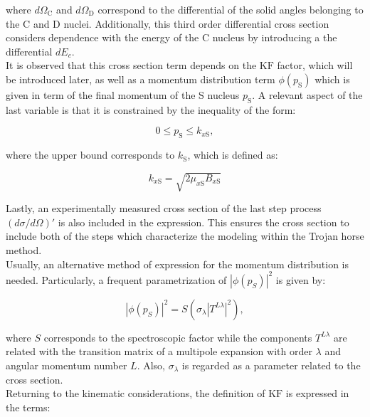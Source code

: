 \documentclass[openany]{book}
\begin{document}
where $d\Omega_\mathrm{C}$ and $d\Omega_\mathrm{D}$ correspond to the differential of the solid angles belonging to the C and D nuclei. Additionally, this third order differential cross section considers dependence with the energy of the C nucleus by introducing a the differential $dE_c$. \\ 

It is observed that this cross section term depends on the $\mathrm{KF}$ factor, which will be introduced later, as well as a momentum distribution term $\phi(p_\mathrm{S})$ which is given in term of the final momentum of the S nucleus $p_\mathrm{S}$. A relevant aspect of the last variable is that it is constrained by the inequality of the form:

\begin{equation}\label{eq:special_THM_momentum_inequality}
	0 \le p_\mathrm{S} \le k_{x\mathrm{S}},
\end{equation}

where the upper bound corresponds to $k_{\mathrm{S}}$, which is defined as: 

\begin{equation}\label{eq:special_THM_momentum_max}
	k_{x\mathrm{S}} = \sqrt{2 \mu_{x\mathrm{S}}  B_{x\mathrm{S}}}
\end{equation}

Lastly, an experimentally measured cross section of the last step process $(d\sigma/d\Omega)'$ is also included in the expression. This ensures the cross section to include both of the steps which characterize the modeling within the Trojan horse method.  \\

Usually, an alternative method of expression for the momentum distribution is needed. Particularly, a frequent parametrization of $|\phi(p_S)|^2$ is given by:

\begin{equation}\label{eq:special_THM_momentumDistribution}
	|\phi(p_S)|^2  = S (\sigma_{\lambda} |T^{L \lambda}|^2 ),
\end{equation}

where $S$ corresponds to the spectroscopic factor while the components $T^{L\lambda}$ are related with the transition matrix of a multipole expansion with order $\lambda$ and angular momentum number $L$. Also, $\sigma_\lambda$ is regarded as a parameter related to the cross section. \\

Returning to the kinematic considerations, the definition of   $\mathrm{KF}$ is expressed in the terms: 
\end{document}
